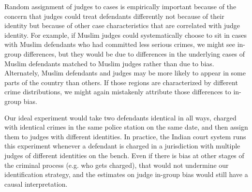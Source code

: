 \documentclass[12pt,english]{article}
\begin{document}
Random assignment of judges to cases is empirically important because of the concern that judges could treat defendants differently not because of their identity but because of other case characteristics that are correlated with judge identity. For example, if Muslim judges could systematically choose to sit in cases with Muslim defendants who had committed less serious crimes, we might see in-group differences, but they would be due to differences in the underlying cases of Muslim defendants matched to Muslim judges rather than due to bias. Alternately, Muslim defendants and judges may be more likely to appear in some parts of the country than others. If those regions are characterized by different crime distributions, we might again mistakenly attribute those differences to in-group bias.

Our ideal experiment would take two defendants identical in all ways, charged with identical crimes in the same police station on the same date, and then assign them to judges with different identities. In practice, the Indian court system runs this experiment whenever a defendant is charged in a jurisdiction with multiple judges of different identities on the bench. Even if there is bias at other stages of the criminal process (e.g. who gets charged), that would not undermine our identification strategy, and the estimates on judge in-group bias would still have a causal interpretation. 
\end{document}
